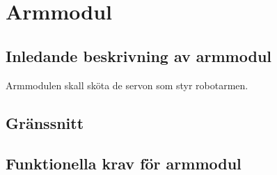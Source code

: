 \section{Armmodul}

\subsection{Inledande beskrivning av armmodul}
Armmodulen skall sköta de servon som styr robotarmen.

\subsection{Gränssnitt}
\begin{LIPSkravlista}
\end{LIPSkravlista}

\subsection{Funktionella krav för armmodul}
\begin{LIPSkravlista}
\end{LIPSkravlista}
